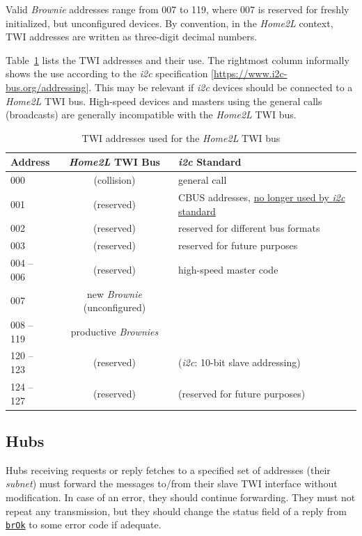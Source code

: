 \documentclass[12pt,english,parskip=half,headheight=19pt]{scrreprt}
\newcommand{\refapic}[1]{\href{home2l-api_c/index.html}{\mbox{\texttt{#1}}}}            %
\begin{document}
Valid \textit{Brownie} addresses range from 007 to 119, where 007 is reserved for freshly initialized, but unconfigured devices. By convention, in the \textit{Home2L} context, TWI addresses are written as three-digit decimal numbers.

Table~\ref{tab:brownies-addresses} lists the TWI addresses and their use. The rightmost column informally shows the use according to the \textit{i2c} specification [\url{https://www.i2c-bus.org/addressing}]. This may be relevant if \textit{i2c} devices should be connected to a \textit{Home2L} TWI bus. High-speed devices and masters using the general calls (broadcasts) are generally incompatible with the \textit{Home2L} TWI bus.

\begin{table}[ht]
  \centering
  \renewcommand{\arraystretch}{1.4}
  \begin{tabular}{l|c|l}
    Address & \textit{Home2L} TWI Bus & \textit{i2c} Standard \\
    \hline \hline
    000        & (collision)   & general call \\
    001        & (reserved)    & CBUS addresses, \href{https://www.i2c-bus.org/addressing/cbus-addresses}{no longer used by \textit{i2c} standard} \\
    002        & (reserved)    & reserved for different bus formats \\
    003        & (reserved)    & reserved for future purposes \\
    004 -- 006 & (reserved)    & high-speed master code \\
    007        & new \textit{Brownie} (unconfigured) & \\
    008 -- 119 & productive \textit{Brownies} \\
    120 -- 123 & (reserved)    & (\textit{i2c}: 10-bit slave addressing) \\
    124 -- 127 & (reserved)    & (reserved for future purposes) \\
  \end{tabular}
  \caption[l]{TWI addresses used for the \textit{Home2L} TWI bus}
  \label{tab:brownies-addresses}
\end{table}



\subsection{Hubs}
\label{sec:brownies-bus-hubs}

Hubs receiving requests or reply fetches to a specified set of addresses (their \textit{subnet}) must forward the messages to/from their slave TWI interface without modification. In case of an error, they should continue forwarding. They must not repeat any transmission, but they should change the status field of a reply from \refapic{brOk} to some error code if adequate.
\end{document}
